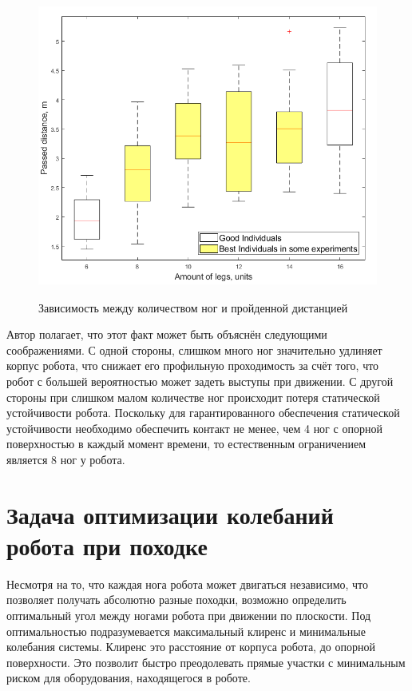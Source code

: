 \begin{figure}[H]
    \centering\includegraphics[height=10cm,width=1\textwidth,keepaspectratio]{images/box_plot_structural_synthesis.png}
    \caption{Зависимость между количеством ног и пройденной дистанцией}
    \label{fig:box_plot_structural_synthesis.png}
\end{figure}

Автор полагает, что этот факт может быть объяснён следующими соображениями. С одной стороны, слишком много ног значительно удлиняет корпус робота, что снижает его профильную проходимость за счёт того, что робот с большей вероятностью может задеть выступы при движении. С другой стороны при слишком малом количестве ног происходит потеря статической устойчивости робота. Поскольку для гарантированного обеспечения статической устойчивости необходимо обеспечить контакт не менее, чем 4 ног с опорной поверхностью в каждый момент времени, то естественным ограничением является 8 ног у робота.


\section{Задача оптимизации колебаний робота при походке}
Несмотря на то, что каждая нога робота может двигаться независимо, что позволяет получать абсолютно разные походки, возможно определить оптимальный угол между ногами робота при движении по плоскости. Под оптимальностью подразумевается максимальный клиренс и минимальные колебания системы. Клиренс это расстояние от корпуса робота, до опорной поверхности. Это позволит быстро преодолевать прямые участки с минимальным риском для оборудования, находящегося в роботе.

